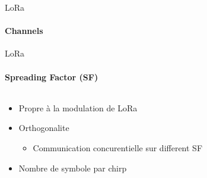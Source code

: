 \begin{frame}{LoRa}
\framesubtitle{Channels}
\end{frame}

\begin{frame}{LoRa}
\framesubtitle{Spreading Factor (SF)}
\begin{columns}
  \begin{column}{0.5\textwidth}
    \begin{itemize}
      \item Propre à la modulation de LoRa
      \item Orthogonalite
      \begin{itemize}
        \item Communication concurentielle sur different SF
      \end{itemize}
      \item Nombre de symbole par chirp
    \end{itemize}
  \end{column}
  \begin{column}{0.5\textwidth}
    
  \end{column}
\end{columns}
\end{frame}
